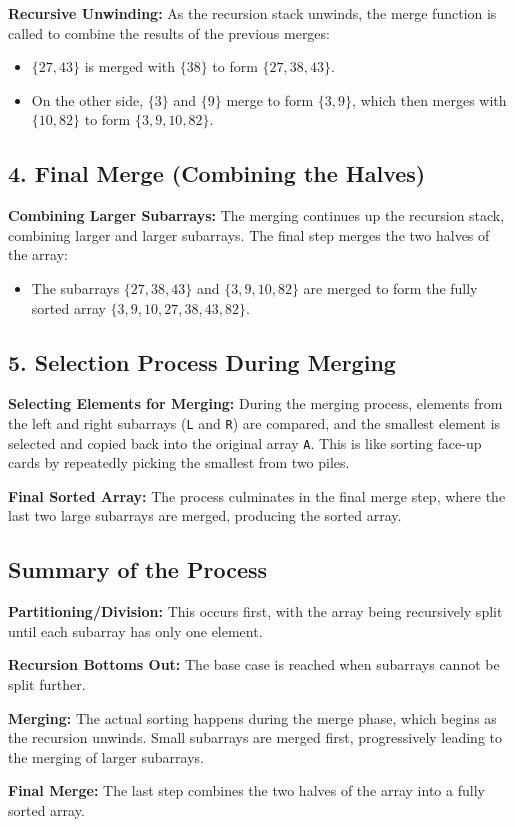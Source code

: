 \documentclass{article}
\begin{document}
\textbf{Recursive Unwinding:} As the recursion stack unwinds, the merge function is called to combine the results of the previous merges:
\begin{itemize}
    \item \(\{27, 43\}\) is merged with \(\{38\}\) to form \(\{27, 38, 43\}\).
    \item On the other side, \(\{3\}\) and \(\{9\}\) merge to form \(\{3, 9\}\), which then merges with \(\{10, 82\}\) to form \(\{3, 9, 10, 82\}\).
\end{itemize}

\subsection*{4. Final Merge (Combining the Halves)}
\textbf{Combining Larger Subarrays:} The merging continues up the recursion stack, combining larger and larger subarrays. The final step merges the two halves of the array:
\begin{itemize}
    \item The subarrays \(\{27, 38, 43\}\) and \(\{3, 9, 10, 82\}\) are merged to form the fully sorted array \(\{3, 9, 10, 27, 38, 43, 82\}\).
\end{itemize}

\subsection*{5. Selection Process During Merging}
\textbf{Selecting Elements for Merging:} During the merging process, elements from the left and right subarrays (\texttt{L} and \texttt{R}) are compared, and the smallest element is selected and copied back into the original array \texttt{A}. This is like sorting face-up cards by repeatedly picking the smallest from two piles.

\textbf{Final Sorted Array:} The process culminates in the final merge step, where the last two large subarrays are merged, producing the sorted array.

\subsection*{Summary of the Process}
\textbf{Partitioning/Division:} This occurs first, with the array being recursively split until each subarray has only one element.

\textbf{Recursion Bottoms Out:} The base case is reached when subarrays cannot be split further.

\textbf{Merging:} The actual sorting happens during the merge phase, which begins as the recursion unwinds. Small subarrays are merged first, progressively leading to the merging of larger subarrays.

\textbf{Final Merge:} The last step combines the two halves of the array into a fully sorted array.
\end{document}
